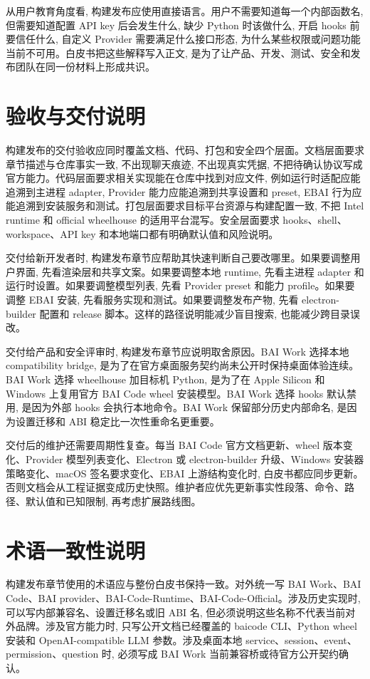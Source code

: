 从用户教育角度看, 构建发布应使用直接语言。用户不需要知道每一个内部函数名, 但需要知道配置 API key 后会发生什么, 缺少 Python 时该做什么, 开启 hooks 前要信任什么, 自定义 Provider 需要满足什么接口形态, 为什么某些权限或问题功能当前不可用。白皮书把这些解释写入正文, 是为了让产品、开发、测试、安全和发布团队在同一份材料上形成共识。

\section{验收与交付说明}
构建发布的交付验收应同时覆盖文档、代码、打包和安全四个层面。文档层面要求章节描述与仓库事实一致, 不出现聊天痕迹, 不出现真实凭据, 不把待确认协议写成官方能力。代码层面要求相关实现能在仓库中找到对应文件, 例如运行时适配应能追溯到主进程 adapter, Provider 能力应能追溯到共享设置和 preset, EBAI 行为应能追溯到安装服务和测试。打包层面要求目标平台资源与构建配置一致, 不把 Intel runtime 和 official wheelhouse 的适用平台混写。安全层面要求 hooks、shell、workspace、API key 和本地端口都有明确默认值和风险说明。

交付给新开发者时, 构建发布章节应帮助其快速判断自己要改哪里。如果要调整用户界面, 先看渲染层和共享文案。如果要调整本地 runtime, 先看主进程 adapter 和运行时设置。如果要调整模型列表, 先看 Provider preset 和能力 profile。如果要调整 EBAI 安装, 先看服务实现和测试。如果要调整发布产物, 先看 electron-builder 配置和 release 脚本。这样的路径说明能减少盲目搜索, 也能减少跨目录误改。

交付给产品和安全评审时, 构建发布章节应说明取舍原因。BAI Work 选择本地 compatibility bridge, 是为了在官方桌面服务契约尚未公开时保持桌面体验连续。BAI Work 选择 wheelhouse 加目标机 Python, 是为了在 Apple Silicon 和 Windows 上复用官方 BAI Code wheel 安装模型。BAI Work 选择 hooks 默认禁用, 是因为外部 hooks 会执行本地命令。BAI Work 保留部分历史内部命名, 是因为设置迁移和 ABI 稳定比一次性重命名更重要。

交付后的维护还需要周期性复查。每当 BAI Code 官方文档更新、wheel 版本变化、Provider 模型列表变化、Electron 或 electron-builder 升级、Windows 安装器策略变化、macOS 签名要求变化、EBAI 上游结构变化时, 白皮书都应同步更新。否则文档会从工程证据变成历史快照。维护者应优先更新事实性段落、命令、路径、默认值和已知限制, 再考虑扩展路线图。

\section{术语一致性说明}
构建发布章节使用的术语应与整份白皮书保持一致。对外统一写 BAI Work、BAI Code、BAI provider、BAI-Code-Runtime、BAI-Code-Official。涉及历史实现时, 可以写内部兼容名、设置迁移名或旧 ABI 名, 但必须说明这些名称不代表当前对外品牌。涉及官方能力时, 只写公开文档已经覆盖的 baicode CLI、Python wheel 安装和 OpenAI-compatible LLM 参数。涉及桌面本地 service、session、event、permission、question 时, 必须写成 BAI Work 当前兼容桥或待官方公开契约确认。

